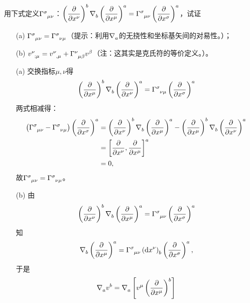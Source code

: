 \begin{xiti}
	\item \hypertarget{3.4}{} 用下式定义$\ChristoffelSymbol{\sigma}{\mu}{\nu}$：$\displaystyle\tensor{\left(\pdv{x^\nu}\right)}{^b}\Nabla{b}\tensor{\left(\pdv{x^\mu}\right)}{^a}=\ChristoffelSymbol{\sigma}{\mu}{\nu}\tensor{\left(\pdv{x^\sigma}\right)}{^a} $，试证
	\begin{enumerate}
		\item[(a)] $\ChristoffelSymbol{\sigma}{\mu}{\nu}=\ChristoffelSymbol{\sigma}{\nu}{\mu}$（提示：利用$\Nabla{a}$的无挠性和坐标基矢间的对易性。）；
		\item[(b)] $\tensor{v}{^\nu_{;\mu}}=\tensor{v}{^\nu_{,\mu}}+\ChristoffelSymbol{\nu}{\mu}{\beta}\tensor{v}{^\beta} $（注：这其实是克氏符的等价定义。）。
	\end{enumerate}
	
	\begin{zm}
		\begin{enumerate}
			\item[(a)] 交换指标$\mu,\nu$得
			\begin{displaymath}
			\tensor{\left(\pdv{x^\mu}\right)}{^b}\Nabla{b}\tensor{\left(\pdv{x^\nu}\right)}{^a}=\ChristoffelSymbol{\sigma}{\nu}{\mu}\tensor{\left(\pdv{x^\sigma}\right)}{^a}
			\end{displaymath}
			两式相减得：
			\begin{align*}
			\left(  \ChristoffelSymbol{\sigma}{\mu}{\nu}-\ChristoffelSymbol{\sigma}{\nu}{\mu} \right) \tensor{\left(\pdv{x^\sigma} \right)}{^a}= &\tmu  \tensor{\left(\pdv{x^\nu}\right)}{^b} \Nabla{b} \tensor{\left(\pdv{x^\mu}\right)}{^a}-\tensor{\left(\pdv{x^\mu}\right)}{^b} \Nabla{b} \tensor{\left(\pdv{x^\nu}\right)}{^a}\\
			=&\tmu \tensor{\left[\pdv{x^\nu},\pdv{x^\mu} \right]}{^a}\\
			=&\; 0,
			\end{align*}
			故$\ChristoffelSymbol{\sigma}{\mu}{\nu}=\ChristoffelSymbol{\sigma}{\nu}{\mu} $。
			\item[(b)] 由$$\tensor{\left(\pdv{x^\nu}\right)}{^b}\Nabla{b}\tensor{\left(\pdv{x^\mu}\right)}{^a}=\ChristoffelSymbol{\sigma}{\mu}{\nu}\tensor{\left(\pdv{x^\sigma}\right)}{^a}$$知$$\Nabla{b}\tensor{\left(\pdv{x^\mu}\right)}{^a}=\ChristoffelSymbol{\sigma}{\mu}{\nu}\tensor{\left(\dd{x^\nu}\right)}{_b} \tensor{\left(\pdv{x^\sigma}\right)}{^a}, $$于是
			\begin{align*}
			\Nabla{a} \tensor{v}{^b} 
			=&\; \Nabla{a} \left[ \tensor{v}{^\mu} \tensor{\left(\pdv{x^\mu}\right)}{^b} \right] \\

\end{align*}
\end{enumerate}
\end{zm}
\end{xiti}

